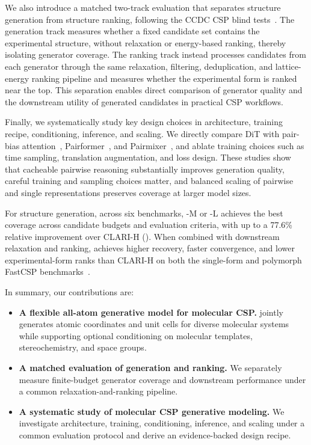 We also introduce a matched two-track evaluation that separates structure generation from structure ranking, following the CCDC CSP blind tests~\citep{hunnisett2024seventhranking,hunnisett2024seventhgeneration}. The generation track measures whether a fixed candidate set contains the experimental structure, without relaxation or energy-based ranking, thereby isolating generator coverage. The ranking track instead processes candidates from each generator through the same relaxation, filtering, deduplication, and lattice-energy ranking pipeline and measures whether the experimental form is ranked near the top. This separation enables direct comparison of generator quality and the downstream utility of generated candidates in practical CSP workflows.

Finally, we systematically study key design choices in architecture, training recipe, conditioning, inference, and scaling. We directly compare DiT with pair-bias attention~\citep{peebles2023scalable}, Pairformer~\citep{Abramson2024}, and Pairmixer~\citep{ouyangzhang2025triangle}, and ablate training choices such as time sampling, translation augmentation, and loss design. These studies show that cacheable pairwise reasoning substantially improves generation quality, careful training and sampling choices matter, and balanced scaling of pairwise and single representations preserves coverage at larger model sizes.



For structure generation, across six benchmarks, \model{}-M or \model{}-L achieves the best coverage across candidate budgets and evaluation criteria, with up to a 77.6\% relative improvement over CLARI-H (). When combined with downstream relaxation and ranking, \model{} achieves higher recovery, faster convergence, and lower experimental-form ranks than CLARI-H on both the single-form and polymorph FastCSP benchmarks~\citep{gharakhanyan2025fastcsp}.

In summary, our contributions are:
\begin{itemize}
    \item \textbf{A flexible all-atom generative model for molecular CSP.}
    \model{} jointly generates atomic coordinates and unit cells for diverse molecular systems while supporting optional conditioning on molecular templates, stereochemistry, and space groups.
    \item \textbf{A matched evaluation of generation and ranking.}
    We separately measure finite-budget generator coverage and downstream performance under a common relaxation-and-ranking pipeline.
    \item \textbf{A systematic study of molecular CSP generative modeling.}
    We investigate architecture, training, conditioning, inference, and scaling under a common evaluation protocol and derive an evidence-backed design recipe.
\end{itemize}